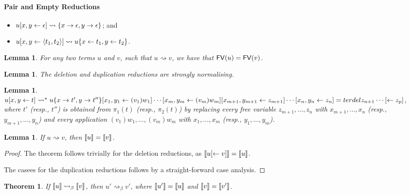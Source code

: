 \documentclass[11pt,a4paper]{article}
\theoremstyle{definition}
\theoremstyle{plain}
\newtheorem{lemma}[definition]{Lemma}
\newtheorem{theorem}[definition]{Theorem}
\theoremstyle{remark}
\begin{document}
\paragraph{Pair and Empty Reductions}

\begin{itemize}
	\item $u{[{x},{y}\leftarrow{\epsilon}]}\rightsquigarrow\{x\rightarrow\epsilon,y\rightarrow\epsilon\}$; and
	\item $u{[{x},{y}\leftarrow{{\langle{t_1},{t_2}\rangle}}]}\rightsquigarrow u\{x\leftarrow t_1,y\leftarrow t_2\}$.
\end{itemize}

\begin{lemma}
	For any two terms $u$ and $v$, such that $u\rightsquigarrow v$, we have that ${\mathop{\mathsf{FV}}}(u)={\mathop{\mathsf{FV}}}(v)$.
\end{lemma}

\begin{lemma}
	The deletion and duplication reductions are strongly normalising.
\end{lemma}

\begin{lemma}
	$u{[{x},{y}\leftarrow{t}]}\rightsquigarrow^\star u\{x\rightarrow t',y\rightarrow t''\}{[{x_1},{y_1}\leftarrow{(v_1)w_1}]}\cdots{[{x_m},{y_m}\leftarrow{(v_m)w_m}]}{[{x_{m+1}},{y_{m+1}}\leftarrow{z_{m+1}}]}\cdots{[{x_n},{y_n}\leftarrow{z_n}]}=terdel{z_{n+1}}\cdots{[\leftarrow{z_p}]}$,
where $t'$ (resp., $t''$) is obtained from $\pi_1(t)$ (resp., $\pi_2(t)$) by replacing every free variable $z_{m+1},\dots,z_n$ with $x_{m+1},\dots,x_n$ (resp., $y_{m+1},\dots,y_n$) and every application $(v_1)w_1,\dots,(v_m)w_m$ with $x_1,\dots,x_m$ (resp., $y_1,\dots,y_m$).
\end{lemma}

\begin{lemma}
	If $u\rightsquigarrow v$, then ${\llbracket{u}\rrbracket}={\llbracket{v}\rrbracket}$.
\end{lemma}

\begin{proof}
	The theorem follows trivially for the deletion reductions, as ${\llbracket{u{[\leftarrow{v}]}}\rrbracket}={\llbracket{u}\rrbracket}$.

	The casees for the duplication reductions follows by a straight-forward case analysis.
\end{proof}

\begin{theorem}
	If\/ ${\llbracket{u}\rrbracket}\rightsquigarrow_\beta{\llbracket{v}\rrbracket}$, then $u'\rightsquigarrow_\beta v'$, where ${\llbracket{u'}\rrbracket}={\llbracket{u}\rrbracket}$ and ${\llbracket{v}\rrbracket}={\llbracket{v'}\rrbracket}$.
\end{theorem}
\end{document}
